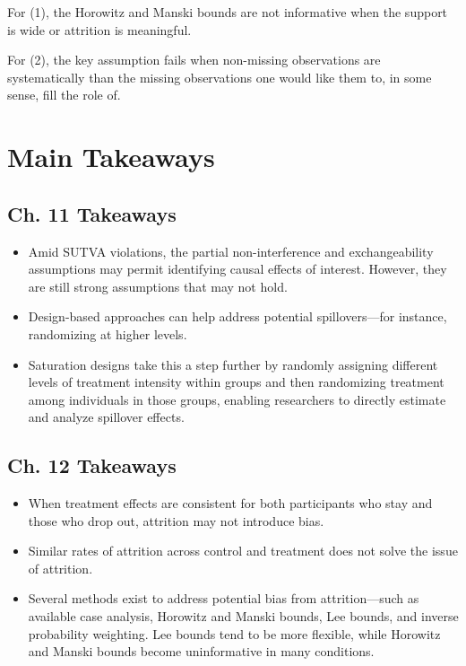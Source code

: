 \documentclass[10pt]{article}
\begin{document}
\hrulefill\hspace{0.5em}\dotfill\hspace{0.5em}\hrulefill

For (1), the Horowitz and Manski bounds are not informative 
when the support is wide or attrition is meaningful.

For (2), the key assumption fails when
non-missing observations are systematically than 
the 
missing observations one would like them to, in some sense,
fill the role of. 


\section{Main Takeaways}

\subsection{Ch. 11 Takeaways}

\begin{itemize}
    \item Amid SUTVA violations, the partial non-interference and exchangeability assumptions may permit identifying causal effects of interest. However, they are still strong assumptions that may not hold.
    \item Design-based approaches can help address potential spillovers—for instance, randomizing at higher levels.
    \item Saturation designs take this a step further by randomly assigning different levels of treatment intensity within groups and then randomizing treatment among individuals in those groups, enabling researchers to directly estimate and analyze spillover effects.
\end{itemize}

\subsection{Ch. 12 Takeaways}

\begin{itemize}
    \item When treatment effects are consistent for both participants who stay and those who drop out, attrition may not introduce bias.
    \item Similar rates of attrition across control and treatment does not solve the issue of attrition.
    \item Several methods exist to address potential bias from attrition—such as available case analysis, Horowitz and Manski bounds, Lee bounds, and inverse probability weighting. Lee bounds tend to be more flexible, while Horowitz and Manski bounds become uninformative in many conditions.
\end{itemize}
\end{document}
